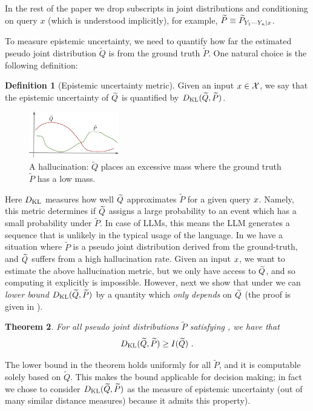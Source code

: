 \documentclass[a4paper]{article}
\theoremstyle{plain}
\newtheorem{theorem}{Theorem}[section]
\theoremstyle{definition}
\newtheorem{definition}[theorem]{Definition}
\theoremstyle{plain}
\begin{document}
In the rest of the paper we drop subscripts in joint distributions and conditioning on query $x$ (which is understood implicitly), for example,
$\widetilde P \equiv \widetilde P_{Y_1 \cdots Y_n \mid x}$.

To measure epistemic uncertainty, we need to quantify how far the estimated pseudo joint distribution $\tilde Q$ is from the ground truth $\tilde P$. One natural choice is the following definition:
%
%
\begin{definition}[Epistemic uncertainty metric]
Given an input $x \in {\mathcal{X}}$, we say that the epistemic uncertainty of $\widetilde{Q}$ is quantified by
$D_{\mathrm{KL}}(\widetilde{Q}, \widetilde P)$.
\end{definition}
\begin{figure}  %
\vspace{-5mm}
       \includegraphics[width=0.35\textwidth]{hallucination2.pdf} 
  \caption{
    A hallucination: $\widetilde Q$ places an excessive mass where the ground truth $\widetilde P$ has a low mass.
    }
\label{fig:hallucination}
\end{figure}
Here $D_{\mathrm{KL}}$ measures how well $\widetilde{Q}$ approximates $\widetilde P$ for a given query $x$.
%
Namely, this metric determines if $\widetilde{Q}$ assigns a large probability to an event which has a small probability under $\widetilde P$.
In case of LLMs, this means the LLM generates a sequence that is unlikely in the typical usage of the language.
In  we have a situation where $\widetilde P$ is a pseudo joint distribution derived from the ground-truth, and $\widetilde {Q}$ suffers from a high hallucination rate. 
%
%
Given an input $x$, we want to estimate the above hallucination metric, but we only have access to $\widetilde{Q}$,
and so computing it explicitly is impossible.
%
However, next we show that under  we can \emph{lower bound} $D_{\mathrm{KL}}(\widetilde{Q}, \widetilde P)$
by a quantity which \emph{only depends} on $\widetilde{Q}$ (the proof is given in ).
%



\begin{theorem}
\label{thm:MI}
For all pseudo joint distributions $\widetilde P$ satisfying , we have that 
\[
  D_{\mathrm{KL}}(\widetilde {Q} , \widetilde P) \ge I(\widetilde {Q})~.
\]
\end{theorem}
%
The lower bound in the theorem holds uniformly for all $\widetilde P$, and it is computable solely based on $\tilde Q$. This makes the bound applicable for decision making; in fact we chose to consider  $D_{\mathrm{KL}}(\widetilde {Q}, \widetilde P)$ as the measure of epistemic uncertainty (out of many similar distance measures) because it admits this property).
\end{document}
